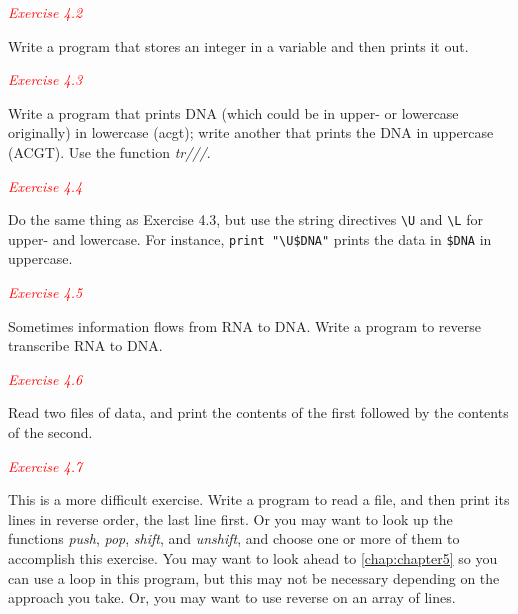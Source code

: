 \textcolor{red}{\textit{Exercise 4.2}}
\begin{adjustwidth}{1cm}{}
Write a program that stores an integer in a variable and then prints it out. 
\end{adjustwidth}

\textcolor{red}{\textit{Exercise 4.3}}
\begin{adjustwidth}{1cm}{}
Write a program that prints DNA (which could be in upper- or lowercase originally) in lowercase (acgt); write another that prints the DNA in uppercase (ACGT). Use the function \textit{tr///}. 
\end{adjustwidth}

\textcolor{red}{\textit{Exercise 4.4}}
\begin{adjustwidth}{1cm}{}
Do the same thing as Exercise 4.3, but use the string directives \verb|\U| and \verb|\L| for upper- and lowercase. For instance, \verb|print "\U$DNA"| prints the data in \verb|$DNA| in uppercase. 
\end{adjustwidth}

\textcolor{red}{\textit{Exercise 4.5}}
\begin{adjustwidth}{1cm}{}
Sometimes information flows from RNA to DNA. Write a program to reverse transcribe RNA to DNA. 
\end{adjustwidth}

\textcolor{red}{\textit{Exercise 4.6}}
\begin{adjustwidth}{1cm}{}
Read two files of data, and print the contents of the first followed by the contents of the second. 
\end{adjustwidth}

\textcolor{red}{\textit{Exercise 4.7}}
\begin{adjustwidth}{1cm}{}
This is a more difficult exercise. Write a program to read a file, and then print its lines in reverse order, the last line first. Or you may want to look up the functions \textit{push}, \textit{pop}, \textit{shift}, and \textit{unshift}, and choose one or more of them to accomplish this exercise. You may want to look ahead to \autoref{chap:chapter5} so you can use a loop in this program, but this may not be necessary depending on the approach you take. Or, you may want to use reverse on an array of lines. 
\end{adjustwidth}

